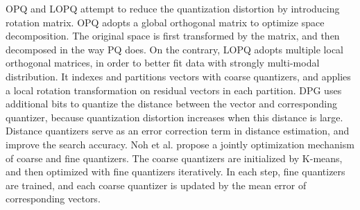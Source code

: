 \documentclass[11pt]{article}
\begin{document}
OPQ \cite{DBLP:conf/cvpr/GeHK013} and LOPQ \cite{DBLP:conf/cvpr/KalantidisA14} attempt to reduce the quantization distortion by introducing rotation matrix. OPQ adopts a global orthogonal matrix to optimize space decomposition. The original space is first transformed by the matrix, and then decomposed in the way PQ does. On the contrary, LOPQ adopts multiple local orthogonal matrices, in order to better fit data with strongly multi-modal distribution. It indexes and partitions vectors with coarse quantizers, and applies a local rotation transformation on residual vectors in each partition. DPG \cite{8404126} uses additional bits to quantize the distance between the vector and corresponding quantizer, because quantization distortion increases when this distance is large. Distance quantizers serve as an error correction term in distance estimation, and improve the search accuracy. Noh et al. \cite{Noh_2021_ICCV} propose a jointly optimization mechanism of coarse and fine quantizers. The coarse quantizers are initialized by K-means, and then optimized with fine quantizers iteratively. In each step, fine quantizers are trained, and each coarse quantizer is updated by the mean error of corresponding vectors.
\end{document}
